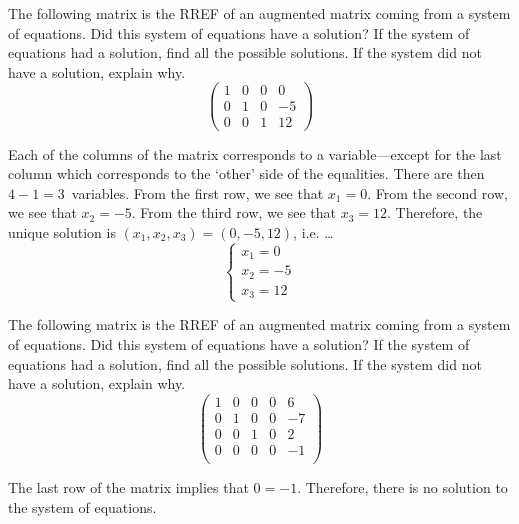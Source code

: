 \documentclass[11pt,letterpaper]{article}
\begin{document}
\newpage



 The following matrix is the RREF of an augmented matrix coming from a system of equations. Did this system of equations have a solution? If the system of equations had a solution, find all the possible solutions. If the system did not have a solution, explain why. 
	\[
	\begin{pmatrix}
	1 & 0 & 0 & 0 \\
	0 & 1 & 0 & -5 \\
	0 & 0 & 1 & 12
	\end{pmatrix}
	\] \pspace

\sol Each of the columns of the matrix corresponds to a variable---except for the last column which corresponds to the `other' side of the equalities. There are then $4 - 1= 3$~variables. From the first row, we see that $x_1= 0$. From the second row, we see that $x_2= -5$. From the third row, we see that $x_3= 12$. Therefore, the unique solution is $(x_1, x_2, x_3)= (0, -5, 12)$, i.e. \dots
	\[
	\begin{cases}
	x_1= 0 \\
	x_2= -5 \\
	x_3= 12
	\end{cases}
	\]



\newpage



 The following matrix is the RREF of an augmented matrix coming from a system of equations. Did this system of equations have a solution? If the system of equations had a solution, find all the possible solutions. If the system did not have a solution, explain why. 
	\[
	\begin{pmatrix}
	1 & 0 & 0 & 0 & 6 \\
	0 & 1 & 0 & 0 & -7 \\
	0 & 0 & 1 & 0 & 2 \\
	0 & 0 & 0 & 0 & -1 \\
	\end{pmatrix}
	\] \pspace

\sol The last row of the matrix implies that $0= -1$. Therefore, there is no solution to the system of equations.  
\end{document}
